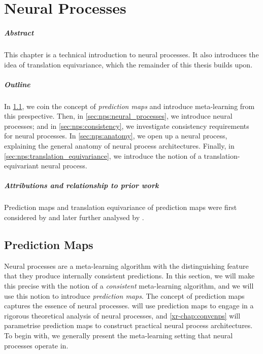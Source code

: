 \documentclass[12pt, twoside]{report}
\newcommand{\xrprefix}[1]{xr-#1}
\begin{document}
\chapter{Neural Processes}
\label{chap:nps}

\paragraph{Abstract}
This chapter is a technical introduction to neural processes.
It also introduces the idea of translation equivariance, which the remainder of this thesis builds upon.

\paragraph{Outline}
In \cref{sec:nps:introduction}, we coin the concept of \emph{prediction maps}
and introduce meta-learning from this prespective.
Then, in \cref{sec:nps:neural_processes}, we introduce neural processes;
and in \cref{sec:nps:consistency}, we investigate consistency requirements for neural processes.
In \cref{sec:nps:anatomy}, we open up a neural process, explaining the general anatomy of neural process architectures.
Finally, in \cref{sec:nps:translation_equivariance}, we introduce the notion of a translation-equivariant neural process. %

\paragraph{Attributions and relationship to prior work}
Prediction maps and translation equivariance of prediction maps were first considered by  and later further analysed by .

\section{Prediction Maps}
\label{sec:nps:introduction}

Neural processes are a meta-learning algorithm with the distinguishing feature that they produce internally consistent predictions.
In this section, we will make this precise with the notion of a \emph{consistent} meta-learning algorithm,
and we will use this notion to introduce \emph{prediction maps}.
The concept of prediction maps captures the essence of neural processes.
\Cref{\xrprefix{chap:predmap}} will use prediction maps to engage in a rigorous theoretical analysis of neural processes,
and \cref{\xrprefix{chap:convcnps}} will parametrise prediction maps to construct practical neural process architectures.
To begin with, we generally present the meta-learning setting that neural processes operate in.
\end{document}
